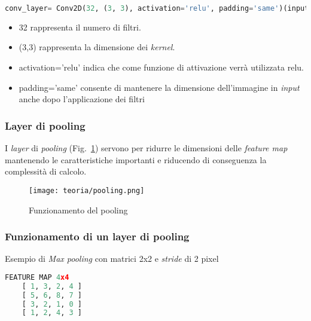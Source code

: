 \begin{lstlisting}[language=Python, frame=none]
    conv_layer= Conv2D(32, (3, 3), activation='relu', padding='same')(input_img)
\end{lstlisting}

\begin{itemize}
    \item 32 rappresenta il numero di filtri.
    \item (3,3) rappresenta la dimensione dei \emph{kernel}.
    \item activation='relu' indica che come funzione di attivazione verrà utilizzata relu.
    \item padding='same' consente di mantenere la dimensione dell'immagine in \emph{input} anche dopo l'applicazione dei filtri
\end{itemize}


\subsubsection{Layer di pooling}
I \emph{layer} di \emph{pooling} (Fig.~\ref{fig:pooling}) servono per ridurre le dimensioni delle \emph{feature map} mantenendo le caratteristiche importanti e riducendo di conseguenza la complessità di calcolo.


\begin{figure}[!h] 
    \centering 
    \texttt{[image: teoria/pooling.png]} 
    \caption{Funzionamento del pooling}
    \label{fig:pooling}
  \end{figure}



\subsubsection{Funzionamento di un layer di pooling}
Esempio di \emph{Max pooling} con matrici 2x2 e \emph{stride} di 2 pixel


\begin{lstlisting}[language=Python, frame=none]
    FEATURE MAP 4x4
    [ 1, 3, 2, 4 ]
    [ 5, 6, 8, 7 ]
    [ 3, 2, 1, 0 ]
    [ 1, 2, 4, 3 ]
\end{lstlisting}

